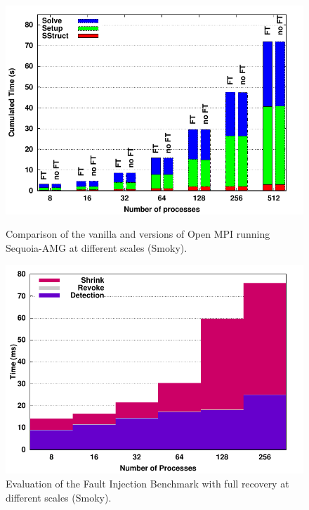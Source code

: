 \begin{figure}
  \begin{minipage}[t]{0.48\linewidth}
    \includegraphics[width=\linewidth]{figures/bargraph.pdf}\vspace{-.4cm}
    \caption{Comparison of the vanilla and \ulfm versions of Open MPI running
      Sequoia-AMG at different scales (Smoky).\label{fig:sequoia:bargraph}}
  \end{minipage}
  \hfill
  \begin{minipage}[t]{0.48\linewidth}
    \includegraphics[width=\linewidth]{figures/scalability.pdf}\vspace{-.4cm}
    \caption{Evaluation of the Fault Injection Benchmark with full
      recovery at different scales (Smoky).\label{fig:frssj:scalability}}
  \end{minipage}\vspace{-.5cm}
\end{figure}

